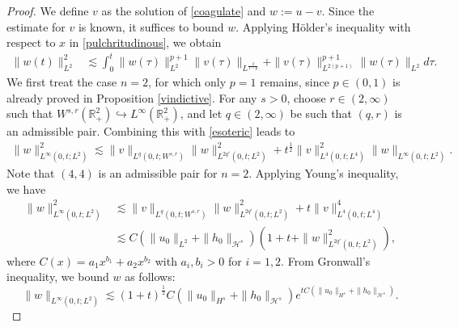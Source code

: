 \documentclass[preprint,compress,12pt]{elsarticle}
\numberwithin{equation}{section}
\begin{document}
\begin{proof}
	We define $v$ as the solution of \eqref{coagulate} and $w:=u-v$.  Since the estimate for $v$ is known, it suffices to bound $w$. Applying H\"{o}lder's inequality with respect to $x$ in \eqref{pulchritudinous}, we obtain
	\begin{equation}\label{esoteric}
		\begin{aligned}
			\|w(t)\|_{L^{2}}^{2}& \lesssim \int_{0}^{t} \|w(\tau)\|_{L^{2}}^{p+1}\|v(\tau)\|_{L^{\frac{2}{1-p}}}+ \|v(\tau)\|_{L^{2(p+1)}}^{p+1}\|w(\tau)\|_{L^{2}} d\tau.
		\end{aligned}
	\end{equation}
	We first treat the case $n=2$, for which only  $p=1$ remains, since $p\in(0,1)$ is already proved in Proposition \ref{vindictive}. For any $s>0$, choose $r\in(2,\infty)$ such that $W^{s,r}(\mathbb{R}^{2}_{+})\hookrightarrow L^{\infty}(\mathbb{R}^{2}_{+})$, and let $q\in(2,\infty)$ be such that $(q,r)$ is an admissible pair. Combining this with \eqref{esoteric} leads to
	\begin{equation}
		\begin{aligned}
			\|w\|_{L^{\infty}(0,t;L^{2})}^{2}\lesssim\|v\|_{L^{q}(0,t;W^{s,r})}\|w\|_{L^{2q'}(0,t;L^{2})}^{2}+ t^{\frac{1}{2}}\|v\|_{L^{4}(0,t;L^{4})}^{2}\|w\|_{L^{\infty}(0,t;L^{2})}.
		\end{aligned}
	\end{equation}
	Note that $(4,4)$ is an admissible pair for $n=2$. Applying Young's inequality, we have
	\begin{equation}
		\begin{aligned}	\|w\|_{L^{\infty}(0,t;L^{2})}^{2}&\lesssim\|v\|_{L^{q}(0,t;W^{s,r})}\|w\|_{L^{2q'}(0,t;L^{2})}^{2}+ t\|v\|_{L^{4}(0,t;L^{4})}^{4}\\&\lesssim C(\|u_{0}\|_{L^{2}}+\|h_{0}\|_{\mathcal{H}^{s}}) \left(1+t+\|w\|_{L^{2q'}(0,t;L^{2})}^{2}\right),
		\end{aligned}
	\end{equation}
	where $C(x)=a_{1}x^{b_{1}}+a_{2}x^{b_{2}}$ with $a_{i},b_{i}>0$ for $i=1,2$. From Gronwall's inequality, we bound $w$ as follows:
	\begin{equation}
		\|w\|_{L^{\infty}(0,t;L^{2})}\lesssim (1+t)^{\frac{1}{2}} C(\|u_{0}\|_{H^{s}}+\|h_{0}\|_{\mathcal{H}^{s}})  e^{tC(\|u_{0}\|_{H^{s}}+\|h_{0}\|_{\mathcal{H}^{s}})}.
	\end{equation}
	

\end{proof}
\end{document}
